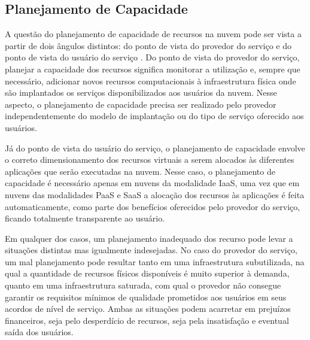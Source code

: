 

\subsection{Planejamento de Capacidade}

A questão do planejamento de capacidade de recursos na nuvem pode ser vista a partir de dois ângulos distintos: do ponto de vista do provedor do serviço e do ponto de vista do usuário do serviço \cite{Menasce2009}. Do ponto de vista do provedor do serviço, planejar a capacidade dos recursos significa monitorar a utilização e, sempre que necessário, adicionar novos  recursos computacionais à infraestrutura física onde são implantados os serviços disponibilizados aos usuários da nuvem. Nesse aspecto, o planejamento de capacidade precisa ser realizado pelo provedor independentemente do modelo de implantação ou do tipo de serviço oferecido aos usuários.

Já do ponto de vista do usuário do serviço, o planejamento de capacidade envolve o correto dimensionamento dos recursos virtuais a serem alocados às diferentes aplicações que serão executadas na nuvem. Nesse caso, o planejamento de capacidade é necessário apenas em nuvens da modalidade IaaS, uma vez que em nuvens das modalidades PaaS e SaaS a alocação dos recursos às aplicações é feita automaticamente, como parte dos benefícios oferecidos pelo provedor do serviço, ficando totalmente transparente ao usuário. 

Em qualquer dos casos, um planejamento inadequado dos recurso pode levar a situações distintas mas igualmente indesejadas. No caso do provedor do serviço, um mal planejamento pode resultar tanto em uma infraestrutura subutilizada, na qual a quantidade de recursos físicos disponíveis é muito superior à demanda, quanto em uma infraestrutura saturada, com qual o provedor não consegue garantir os requisitos mínimos de qualidade prometidos aos usuários em seus acordos de nível de serviço. Ambas as situações podem acarretar em prejuízos financeiros, seja pelo desperdício de recursos, seja pela insatisfação e eventual saída dos usuários.

